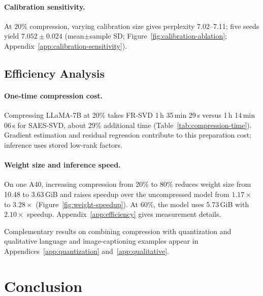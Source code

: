 \documentclass[11pt]{article}
\begin{document}


\paragraph{Calibration sensitivity.}


At $20\%$ compression, varying calibration size gives perplexity 7.02--7.11; five seeds yield $7.052\pm0.024$ (mean$\pm$sample SD; Figure~\ref{fig:calibration-ablation}; Appendix~\ref{app:calibration-sensitivity}).

\subsection{Efficiency Analysis}\label{sec:efficiency}

\paragraph{One-time compression cost.}


Compressing LLaMA-7B at 20\% takes FR-SVD 1\,h 35\,min 29\,s versus 1\,h 14\,min 06\,s for SAES-SVD, about 29\% additional time (Table~\ref{tab:compression-time}). Gradient estimation and residual regression contribute to this preparation cost; inference uses stored low-rank factors.

\paragraph{Weight size and inference speed.}
On one A40, increasing compression from 20\% to 80\% reduces weight size from 10.48 to 3.63\,GiB and raises speedup over the uncompressed model from $1.17\times$ to $3.28\times$ (Figure~\ref{fig:weight-speedup}). At 60\%, the model uses 5.73\,GiB with $2.10\times$ speedup. Appendix~\ref{app:efficiency} gives measurement details.



Complementary results on combining compression with quantization and qualitative language and image-captioning examples appear in Appendices~\ref{app:quantization} and~\ref{app:qualitative}.

\section{Conclusion}\label{sec:conclusion}
\end{document}
